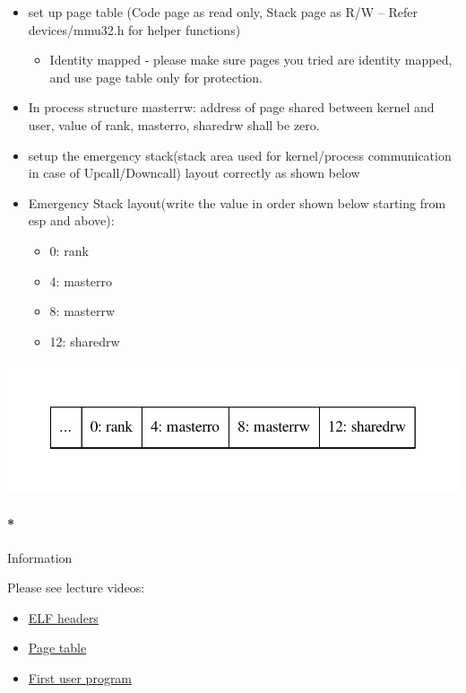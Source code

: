 \documentclass[]{article}
\providecommand{\tightlist}{%
  \setlength{\itemsep}{0pt}\setlength{\parskip}{0pt}}
\let\oldparagraph\paragraph
\renewcommand{\paragraph}[1]{\oldparagraph{#1}\mbox{}}
\begin{document}
\begin{itemize}
\tightlist
\item
  set up page table (Code page as read only, Stack page as R/W -- Refer
  devices/mmu32.h for helper functions)

  \begin{itemize}
  \tightlist
  \item
    Identity mapped - please make sure pages you tried are identity
    mapped, and use page table only for protection.
  \end{itemize}
\item
  In process structure masterrw: address of page shared between kernel
  and user, value of rank, masterro, sharedrw shall be zero.
\item
  setup the emergency stack(stack area used for kernel/process
  communication in case of Upcall/Downcall) layout correctly as shown
  below
\item
  Emergency Stack layout(write the value in order shown below starting
  from esp and above):

  \begin{itemize}
  \tightlist
  \item
    0: rank
  \item
    4: masterro
  \item
    8: masterrw
  \item
    12: sharedrw
  \end{itemize}
\end{itemize}

\includegraphics{graphviz-images/f3006b44bfcfbb88aaffa02f09c92c6ec0ebc1e4.pdf}

\paragraph*{Information}\label{information-9}

Please see lecture videos:

\begin{itemize}
\tightlist
\item
  \href{}{ELF headers}
\item
  \href{}{Page table}
\item
  \href{}{First user program}
\end{itemize}
\end{document}
